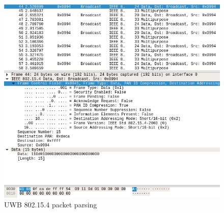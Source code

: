 \documentclass[\main/main.tex]{subfiles}
\begin{document}
\begin{figure}[H]
    \begin{center}
        \includegraphics[scale=0.5]{wireshark_802_15_5_packet.png}
    \end{center}
    \caption{UWB 802.15.4 packet parsing}
    \label{fig:wireshark_802_15_5_packet}
\end{figure}

\bib
\end{document}
